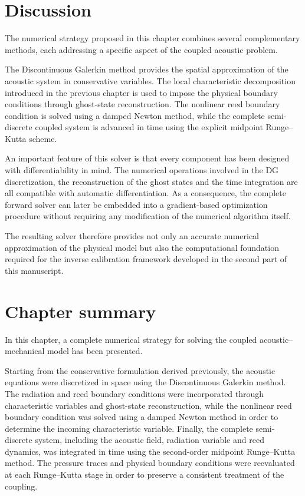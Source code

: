 \documentclass[11pt,a4paper]{report}
\theoremstyle{plain}
\theoremstyle{definition}
\begin{document}
\section{Discussion}

The numerical strategy proposed in this chapter combines several complementary
methods, each addressing a specific aspect of the coupled acoustic problem.

The Discontinuous Galerkin method provides the spatial approximation of the
acoustic system in conservative variables. The local characteristic
decomposition introduced in the previous chapter is used to impose the physical
boundary conditions through ghost-state reconstruction. The nonlinear reed
boundary condition is solved using a damped Newton method, while the complete
semi-discrete coupled system is advanced in time using the explicit midpoint
Runge--Kutta scheme.

An important feature of this solver is that every component has been designed
with differentiability in mind. The numerical operations involved in the DG
discretization, the reconstruction of the ghost states and the time integration
are all compatible with automatic differentiation. As a consequence, the
complete forward solver can later be embedded into a gradient-based optimization
procedure without requiring any modification of the numerical algorithm itself.

The resulting solver therefore provides not only an accurate numerical
approximation of the physical model but also the computational foundation
required for the inverse calibration framework developed in the second part of
this manuscript.


\section*{Chapter summary}

In this chapter, a complete numerical strategy for solving the coupled
acoustic--mechanical model has been presented.

Starting from the conservative formulation derived previously, the acoustic
equations were discretized in space using the Discontinuous Galerkin method.
The radiation and reed boundary conditions were incorporated through
characteristic variables and ghost-state reconstruction, while the nonlinear reed boundary condition was solved using a damped Newton method
in order to determine the incoming characteristic variable.
Finally, the complete semi-discrete system, including the acoustic field,
radiation variable and reed dynamics, was integrated in time using the
second-order midpoint Runge--Kutta method. The pressure traces and physical
boundary conditions were reevaluated at each Runge--Kutta stage in order to
preserve a consistent treatment of the coupling.
\end{document}
